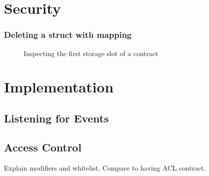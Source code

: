 \begin{appendices}
\chapter{Security}

\subsection{Deleting a struct with mapping} \label{apx:security:mapping}
\begin{figure}[H]
    \centering
    
    \caption{Inspecting the first storage slot of a contract}
    \label{fig:storage}
\end{figure}

\chapter{Implementation}

\section{Listening for Events} \label{apx:implementation:events}

\section{Access Control}\label{apx:implementation:acl}
Explain modifiers and whitelist. Compare to having ACL contract.



\end{appendices}